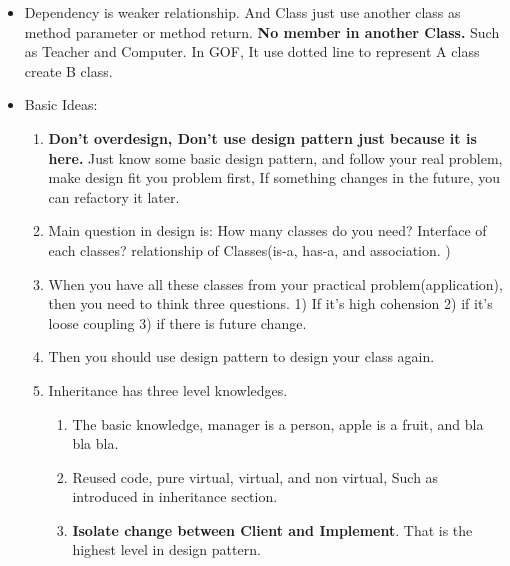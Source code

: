 \documentclass[a4paper,12pt,twoside]{book}
\begin{document}
\begin{itemize}
\item Dependency is weaker relationship. And Class just use another class as method parameter or method return. \textbf{No member in another Class. }  Such as Teacher and Computer. In GOF,  It use dotted line to represent A class create B class. 

\item Basic Ideas:
\begin{enumerate}
\item \textbf{Don't overdesign, Don't use design pattern just because it is here.} Just know some basic design pattern, and follow your real problem, make design fit you problem first, If something changes in the future, you can refactory it later. 

\item Main question in design is: How many classes do you need? Interface of each classes? relationship of Classes(is-a, has-a, and association. ) 

\item When you have all these classes from your practical problem(application), then you need to think three questions. 1) If it's high cohension 2) if it's loose coupling  3) if there is future change. 

\item Then you should use design pattern to design your class again. 

\item Inheritance has three level knowledges.  
\begin{enumerate}
\item The basic knowledge, manager is a person, apple is a fruit, and bla bla bla. 
\item Reused code, pure virtual, virtual, and non virtual, Such as introduced in inheritance section. 
\item \textbf{Isolate change between Client and Implement}. That is the highest level in design pattern. 
\end{enumerate}

\end{enumerate}
\end{itemize}
\end{document}
